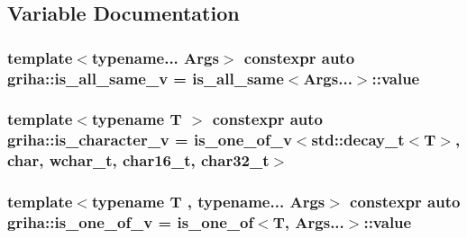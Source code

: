 \subsection{Variable Documentation}
\subsubsection[{\texorpdfstring{is\+\_\+all\+\_\+same\+\_\+v}{is_all_same_v}}]{\setlength{\rightskip}{0pt plus 5cm}template$<$typename... Args$>$ constexpr auto griha\+::is\+\_\+all\+\_\+same\+\_\+v = {\bf is\+\_\+all\+\_\+same}$<$Args...$>$\+::value}\hypertarget{namespacegriha_a3c9eb374b11b670884dfabc46b7bbc23}{}\label{namespacegriha_a3c9eb374b11b670884dfabc46b7bbc23}
\subsubsection[{\texorpdfstring{is\+\_\+character\+\_\+v}{is_character_v}}]{\setlength{\rightskip}{0pt plus 5cm}template$<$typename T $>$ constexpr auto griha\+::is\+\_\+character\+\_\+v = {\bf is\+\_\+one\+\_\+of\+\_\+v}$<$std\+::decay\+\_\+t$<$T$>$, char, wchar\+\_\+t, char16\+\_\+t, char32\+\_\+t$>$}\hypertarget{namespacegriha_af6e5a84a5dad7d2123491eb7124aa2e3}{}\label{namespacegriha_af6e5a84a5dad7d2123491eb7124aa2e3}
\subsubsection[{\texorpdfstring{is\+\_\+one\+\_\+of\+\_\+v}{is_one_of_v}}]{\setlength{\rightskip}{0pt plus 5cm}template$<$typename T , typename... Args$>$ constexpr auto griha\+::is\+\_\+one\+\_\+of\+\_\+v = {\bf is\+\_\+one\+\_\+of}$<$T, Args...$>$\+::value}\hypertarget{namespacegriha_a4143946f18648e253a58b1ecd283a657}{}\label{namespacegriha_a4143946f18648e253a58b1ecd283a657}
